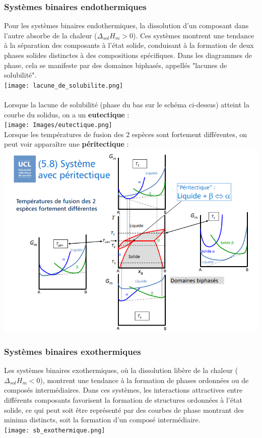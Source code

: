\documentclass{article}
\begin{document}
        \subsubsection{Systèmes binaires endothermiques}
        Pour les systèmes binaires endothermiques, la dissolution d'un composant dans l'autre absorbe de la chaleur ($\Delta_{sol} H_m > 0$). Ces systèmes montrent une tendance à la séparation des composants à l'état solide, conduisant à la formation de deux phases solides distinctes à des compositions spécifiques. Dans les diagrammes de phase, cela se manifeste par des domaines biphasés, appellés "lacunes de solubilité". \\
            \texttt{[image: lacune\_de\_solubilite.png]} \\
        \pagebreak \\
        Lorsque la lacune de solubilité (phase du bas sur le schéma ci-dessus) atteint la courbe du solidus, on a un \textbf{eutectique} : \\
            \texttt{[image: Images/eutectique.png]} \\
        Lorsque les températures de fusion des 2 espèces sont fortement différentes, on peut voir apparaître une \textbf{péritectique} : \\
            \includegraphics[width=0.8\linewidth]{Images/péritectique.png}
        \pagebreak \\
        \subsubsection{Systèmes binaires exothermiques}
        Les systèmes binaires exothermiques, où la dissolution libère de la chaleur ($\Delta_{sol} H_m<0$), montrent une tendance à la formation de phases ordonnées ou de composés intermédiaires. Dans ces systèmes, les interactions attractives entre différents composants favorisent la formation de structures ordonnées à l'état solide, ce qui peut soit être représenté par des courbes de phase montrant des minima distincts, soit la formation d'un composé intermédiaire. \\
            \texttt{[image: sb\_exothermique.png]}
    
\end{document}
